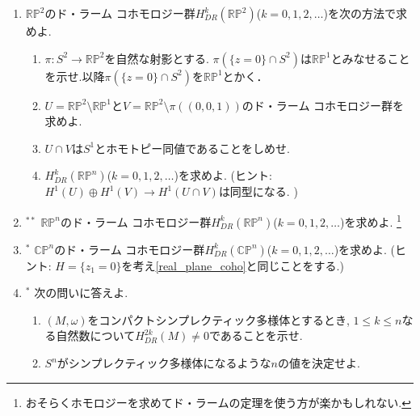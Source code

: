 \documentclass[dvipdfmx,a4paper,11pt]{article}
\newcommand{\R}{\mathbb{R}}
\newcommand{\Z}{\mathbb{Z}}
\newcommand{\C}{\mathbb{C}}
\theoremstyle{definition}
\begin{document}
\begin{enumerate}[label=\textbf{問}\ref*{sec-deRham}.\arabic*]
\item \label{real_plane_coho} $\R \mathbb{P}^2$のド・ラーム コホモロジー群$H^{k}_{DR}(\R \mathbb{P}^2)$($k=0,1,2,\ldots$)を次の方法で求めよ.
\begin{enumerate}
 \setlength{\parskip}{0cm}
  \setlength{\itemsep}{2pt}
  \item $\pi : S^2 \to \R \mathbb{P}^2$を自然な射影とする. $\pi(\{ z=0\} \cap S^2)$は$\R \mathbb{P}^1$とみなせることを示せ.以降$\pi(\{ z=0\} \cap S^2)$を$\R \mathbb{P}^1$とかく． 
  \item $U = \R \mathbb{P}^2 \setminus \R \mathbb{P}^1$と$V = \R \mathbb{P}^2 \setminus \pi((0,0,1))$のド・ラーム コホモロジー群を求めよ. 
  \item $U \cap V$は$S^1$とホモトピー同値であることをしめせ.
  \item $H^{k}_{DR}(\R \mathbb{P}^n)$($k=0,1,2,\ldots$)を求めよ. (ヒント: $H^1(U) \oplus H^1(V) \to H^1(U \cap V)$は同型になる. )
 \end{enumerate}

\item $^{**}$ $\R \mathbb{P}^n$のド・ラーム コホモロジー群$H^{k}_{DR}(\R \mathbb{P}^n)$($k=0,1,2,\ldots$)を求めよ. \footnote{おそらくホモロジーを求めてド・ラームの定理を使う方が楽かもしれない.}

\item $^{*}$  $\C \mathbb{P}^n$のド・ラーム コホモロジー群$H^{k}_{DR}(\C\mathbb{P}^n)$($k=0,1,2,\ldots$)を求めよ. (ヒント: $H = \{ z_1=0\}$を考え\ref{real_plane_coho}と同じことをする.)

\item $^{*}$ 次の問いに答えよ.
\begin{enumerate}
 \setlength{\parskip}{0cm}
  \setlength{\itemsep}{2pt}
\item $(M , \omega)$をコンパクトシンプレクティック多様体とするとき, $1 \le k \le n$なる自然数について$H^{2k}_{DR}(M) \neq 0$であることを示せ. 
\item $S^n$がシンプレクティック多様体になるような$n$の値を決定せよ. 
\end{enumerate}


\end{enumerate}
\end{document}
